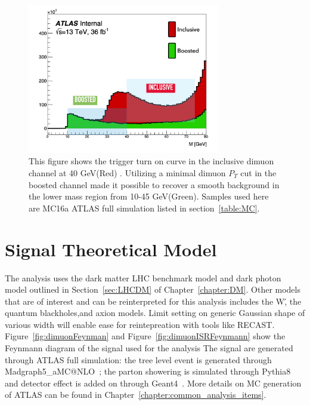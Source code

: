 \begin{figure}[!htb]
    \begin{center}
        \includegraphics[width=0.75\textwidth]{figures/chapter_dimuon/turnon}
        \caption{
        This figure shows the trigger turn on curve in the inclusive dimuon channel at 40 GeV(Red) . Utilizing a minimal dimuon $P_{T}$ cut in the boosted channel made it possible to recover a smooth background in the lower mass region from 10-45 GeV(Green). Samples used here are MC16a ATLAS full simulation listed in section~\ref{table:MC}.
        }
        \label{fig:turnon}
    \end{center}
\end{figure}
\FloatBarrier

\section{Signal Theoretical Model}
The analysis uses the dark matter LHC benchmark model and dark photon model outlined in Section~\ref{sec:LHCDM} of Chapter~\ref{chapter:DM}.
Other models that are of interest and can be reinterpreted for this analysis includes the W\', the quantum blackholes,and axion models. Limit setting on generic Gaussian shape of various width will enable ease for reintepreation with tools like RECAST.
Figure~\ref{fig:dimuonFeynman} and Figure~\ref{fig:dimuonISRFeynmann} show the Feynmann diagram of the signal used for the analysis 
The signal are generated through ATLAS full simulation: the tree level event is generated through Madgraph5\_aMC@NLO~\cite{MG2014}; the parton showering is simulated through Pythia8~\cite{PYTHIA2008} and detector effect is added on through Geant4~\cite{agostinelli2003geant4}. More details on MC generation of ATLAS can be found in Chapter~\ref{chapter:common_analysis_items}.

